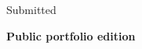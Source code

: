 \begin{titlepage}
  \centering
  \vspace*{2.5cm}
  {\Large\bfseries \modulecode\par}
  \vspace{2.5cm}
  {\Huge\bfseries \thesistitle\par}
  \vspace{2cm}
  {\Large \authorname\par}
  \vspace{0.6cm}
  {\large \degreeprogramme\par}
  \vspace{0.25cm}
  {\large \departmentname\par}
  \vfill
  {\large Submitted \submissiondate\par}
  \vspace{0.35cm}
  {\large\bfseries Public portfolio edition\par}
  {\large \publiceditiondate\par}
\end{titlepage}

